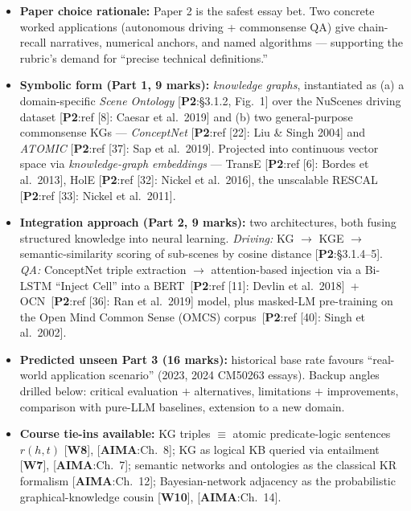 \documentclass[11pt, a4paper]{article}
\newcommand{\paperref}[1]{\textcolor{srcBd}{\small[\textbf{P2}:#1]}}
\newcommand{\aimaref}[1]{\textcolor{srcBd}{\small[\textbf{AIMA}:#1]}}
\newcommand{\courseref}[1]{\textcolor{srcBd}{\small[\textbf{W#1}]}}
\begin{document}
\begin{tldrbox}
\begin{itemize}[leftmargin=*]
  \item \textbf{Paper choice rationale:} Paper 2 is the safest essay bet. Two concrete worked applications (autonomous driving + commonsense QA) give chain-recall narratives, numerical anchors, and named algorithms — supporting the rubric's demand for ``precise technical definitions.''
  \item \textbf{Symbolic form (Part 1, 9 marks):} \emph{knowledge graphs}, instantiated as (a) a domain-specific \emph{Scene Ontology} \paperref{§3.1.2, Fig.\ 1} over the NuScenes driving dataset \paperref{ref [8]: Caesar et al.\ 2019} and (b) two general-purpose commonsense KGs — \emph{ConceptNet} \paperref{ref [22]: Liu \& Singh 2004} and \emph{ATOMIC} \paperref{ref [37]: Sap et al.\ 2019}. Projected into continuous vector space via \emph{knowledge-graph embeddings} — TransE \paperref{ref [6]: Bordes et al.\ 2013}, HolE \paperref{ref [32]: Nickel et al.\ 2016}, the unscalable RESCAL \paperref{ref [33]: Nickel et al.\ 2011}.
  \item \textbf{Integration approach (Part 2, 9 marks):} two architectures, both fusing structured knowledge into neural learning. \emph{Driving:} KG $\to$ KGE $\to$ semantic-similarity scoring of sub-scenes by cosine distance \paperref{§3.1.4--5}. \emph{QA:} ConceptNet triple extraction $\to$ attention-based injection via a Bi-LSTM ``Inject Cell'' into a BERT~\paperref{ref [11]: Devlin et al.\ 2018}~+ OCN~\paperref{ref [36]: Ran et al.\ 2019} model, plus masked-LM pre-training on the Open Mind Common Sense (OMCS) corpus~\paperref{ref [40]: Singh et al.\ 2002}.
  \item \textbf{Predicted unseen Part 3 (16 marks):} historical base rate favours ``real-world application scenario'' (2023, 2024 CM50263 essays). Backup angles drilled below: critical evaluation $+$ alternatives, limitations $+$ improvements, comparison with pure-LLM baselines, extension to a new domain.
  \item \textbf{Course tie-ins available:} KG triples \(\equiv\) atomic predicate-logic sentences \(r(h,t)\) \courseref{8}, \aimaref{Ch.\ 8}; KG as logical KB queried via entailment \courseref{7}, \aimaref{Ch.\ 7}; semantic networks and ontologies as the classical KR formalism \aimaref{Ch.\ 12}; Bayesian-network adjacency as the probabilistic graphical-knowledge cousin \courseref{10}, \aimaref{Ch.\ 14}.
\end{itemize}
\end{tldrbox}
\end{document}
